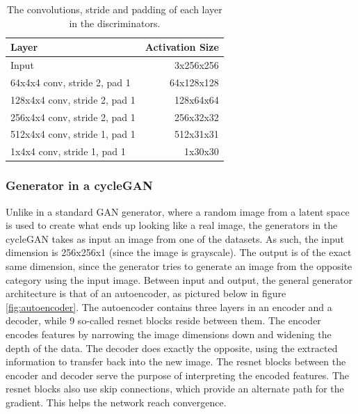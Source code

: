 \documentclass[12pt, fleqn, titlepage]{article}
\begin{document}
\begin{table}[H]\label{discriminator_layers}
	\centering
	\begin{tabular}{lr}\toprule
		Layer                         & Activation Size \\ \midrule
		Input                         & 3x256x256       \\
		64x4x4 conv, stride 2, pad 1  & 64x128x128      \\
		128x4x4 conv, stride 2, pad 1 & 128x64x64       \\
		256x4x4 conv, stride 2, pad 1 & 256x32x32       \\
		512x4x4 conv, stride 1, pad 1 & 512x31x31       \\
		1x4x4 conv, stride 1, pad 1   & 1x30x30         \\ \bottomrule
	\end{tabular}
	\caption{The convolutions, stride and padding of each layer in the discriminators.}
\end{table}


\subsubsection{Generator in a cycleGAN}
Unlike in a standard GAN generator, where a random image from a latent space is used to create what ends up looking like a real image, the generators in the cycleGAN takes as input an image from one of the datasets. As such, the input dimension is 256x256x1 (since the image is grayscale). The output is of the exact same dimension, since the generator tries to generate an image from the opposite category using the input image. Between input and output, the general generator architecture is that of an autoencoder, as pictured below in figure \ref{fig:autoencoder}. The autoencoder contains three layers in an encoder and a decoder, while 9 so-called resnet blocks reside between them. The encoder encodes features by narrowing the image dimensions down and widening the depth of the data. The decoder does exactly the opposite, using the extracted information to transfer back into the new image. The resnet blocks between the encoder and decoder serve the purpose of interpreting the encoded features. The resnet blocks also use skip connections, which provide an alternate path for the gradient. This helps the network reach convergence.
\end{document}
